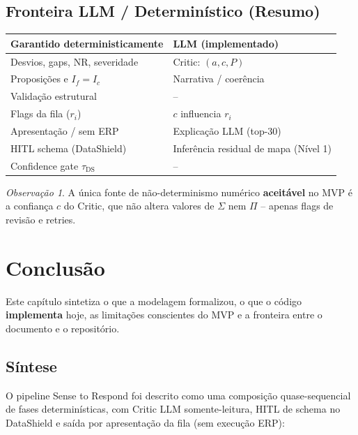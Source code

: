 \documentclass[a4paper, 12pt]{report}
\theoremstyle{definition}
\theoremstyle{remark}
\newtheorem{observacao}{Observa\c{c}\~ao}[chapter]
\begin{document}
\section{Fronteira LLM / Determin\'istico (Resumo)}

\begin{center}
\begin{tabular}{ll}
  \toprule
  \textbf{Garantido deterministicamente} & \textbf{LLM (implementado)} \\
  \midrule
  Desvios, gaps, NR, severidade & Critic: $(a, c, P)$ \\
  Proposi\c{c}\~oes e $I_f = I_c$ & Narrativa / coer\^encia \\
  Valida\c{c}\~ao estrutural & -- \\
  Flags da fila ($r_i$) & $c$ influencia $r_i$ \\
  Apresenta\c{c}\~ao / sem ERP & Explica\c{c}\~ao LLM (top-30) \\
  HITL schema (DataShield) & Infer\^encia residual de mapa (N\'ivel 1) \\
  Confidence gate $\tau_{\text{DS}}$ & -- \\
  \bottomrule
\end{tabular}
\end{center}

\begin{observacao}
  A \'unica fonte de n\~ao-determinismo num\'erico \textbf{aceit\'avel}
  no MVP \'e a confian\c{c}a $c$ do Critic, que n\~ao altera valores
  de $\Sigma$ nem $\Pi$ -- apenas flags de revis\~ao e retries.
\end{observacao}


\chapter{Conclus\~ao}

Este cap\'itulo sintetiza o que a modelagem formalizou, o que o
c\'odigo \textbf{implementa} hoje, as limita\c{c}\~oes conscientes do MVP
e a fronteira entre o documento e o reposit\'orio.


\section{S\'intese}

O pipeline Sense to Respond foi descrito como uma composi\c{c}\~ao
quase-sequencial de fases determin\'isticas, com Critic LLM
somente-leitura, HITL de schema no DataShield e sa\'ida por
apresenta\c{c}\~ao da fila (sem execu\c{c}\~ao ERP):
\end{document}
